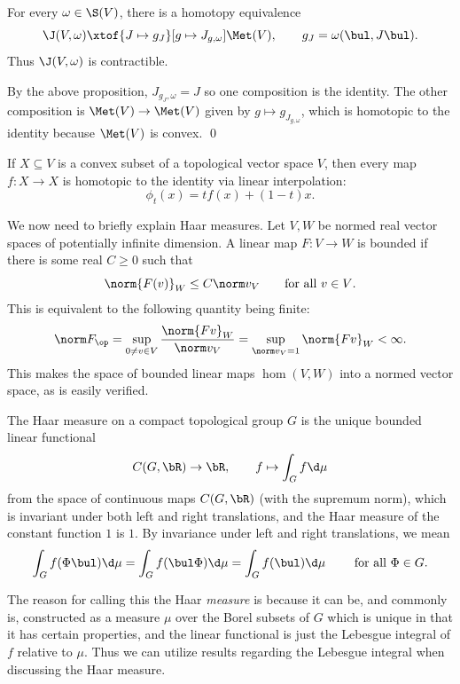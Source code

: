 \eproof

\bcoro[name={compatlincompcontract}]

    For every $\omega\in\S(V)$, there is a homotopy equivalence
    $$ \J(V,\omega) \xtof{J\mapsto g_J}[g\mapsto J_{g,\omega}] \Met(V),\qquad g_J = \omega(\bul,J\bul) . $$
    Thus $\J(V,\omega)$ is contractible.

\ecoro

\bproof

    By the above proposition, $J_{g_J,\omega}=J$ so one composition is the identity.
    The other composition is $\Met(V)\to\Met(V)$ given by $g\mapsto g_{J_{g,\omega}}$, which is homotopic to the identity because $\Met(V)$ is convex.
    \qed

\eproof

\bnote

    If $X\subseteq V$ is a convex subset of a topological vector space $V$, then every map $f\colon X\to X$ is homotopic to the identity via linear interpolation:
    $$ \phi_t(x) = tf(x) + (1-t)x . $$

\enote

We now need to briefly explain Haar measures.
Let $V,W$ be normed real vector spaces of potentially infinite dimension.
A linear map $F\colon V\to W$ is {\emphcolor bounded} if there is some real $C\geq0$ such that
$$ \norm{F(v)}_W \leq C\norm v_V\qquad\hbox{for all $v\in V$} . $$
This is equivalent to the following quantity being finite:
$$ \norm F_\op = \sup_{0\neq v\in V}\frac{\norm{Fv}_W}{\norm v_V} = \sup_{\norm v_V=1}\norm{Fv}_W < \infty . $$
This makes the space of bounded linear maps $\hom(V,W)$ into a normed vector space, as is easily verified.

The {\emphcolor Haar measure} on a compact topological group $G$ is the unique bounded linear functional
$$ C(G,\bR)\to\bR,\qquad f \mapsto \int_Gf\d\mu $$
from the space of continuous maps $C(G,\bR)$ (with the supremum norm), which is invariant under both left and right translations, and the Haar measure of the constant function $1$ is $1$.
By invariance under left and right translations, we mean
$$ \int_Gf(\Phi\bul)\d\mu = \int_Gf(\bul\Phi)\d\mu = \int_Gf(\bul)\d\mu\qquad\hbox{ for all $\Phi\in G$} . $$

The reason for calling this the Haar {\it measure\/} is because it can be, and commonly is, constructed as a measure $\mu$ over the Borel subsets of $G$ which is unique in that it has certain properties,
and the linear functional is just the Lebesgue integral of $f$ relative to $\mu$.
Thus we can utilize results regarding the Lebesgue integral when discussing the Haar measure.


